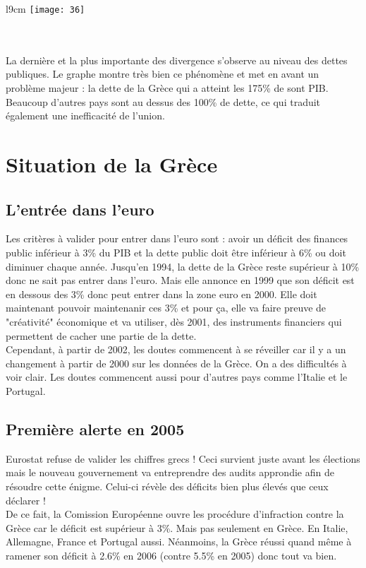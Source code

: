 \begin{wrapfigure}[11]{l}{9cm}
	\texttt{[image: 36]}
\end{wrapfigure}
\ \\ \\ La dernière et la plus importante des divergence s'observe au niveau des dettes publiques. Le graphe montre très bien ce phénomène et met en avant un problème majeur : la dette de la Grèce qui a atteint les 175\% de sont PIB. Beaucoup d'autres pays sont au dessus des 100\% de dette, ce qui traduit également une inefficacité de l'union.

\section{Situation de la Grèce}
\subsection{L'entrée dans l'euro}
Les critères à valider pour entrer dans l'euro sont : avoir un déficit des finances public inférieur à 3\% du PIB et la dette public doit être inférieur à 6\% ou doit diminuer chaque année. Jusqu'en 1994, la dette de la Grèce reste supérieur à 10\% donc ne sait pas entrer dans l'euro. Mais elle annonce en 1999 que son déficit est en dessous des 3\% donc peut entrer dans la zone euro en 2000. Elle doit maintenant pouvoir maintenanir ces 3\% et pour ça, elle va faire preuve de "créativité" économique et va utiliser, dès 2001, des instruments financiers qui permettent de cacher une partie de la dette. \\
Cependant, à partir de 2002, les doutes commencent à se réveiller car il y a un changement à partir de 2000 sur les données de la Grèce. On a des difficultés à voir clair. Les doutes commencent aussi pour d'autres pays comme l'Italie et le Portugal. 

\subsection{Première alerte en 2005}
Eurostat refuse de valider les chiffres grecs ! Ceci survient juste avant les élections mais le nouveau gouvernement va entreprendre des audits approndie afin de résoudre cette énigme. Celui-ci révèle des déficits bien plus élevés que ceux déclarer !\\
De ce fait, la Comission Européenne ouvre les procédure d'infraction contre la Grèce car le déficit est supérieur à 3\%. Mais pas seulement en Grèce. En Italie, Allemagne, France et Portugal aussi. Néanmoins, la Grèce réussi quand même à ramener son déficit à 2.6\% en 2006 (contre 5.5\% en 2005) donc tout va bien.

